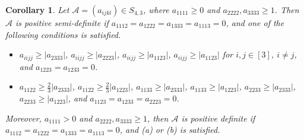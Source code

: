 \documentclass[twoside]{article}
\newtheorem{corollary}{Corollary}[section]
\begin{document}




\begin{corollary}\label{cor4}
Let ${\mathcal{A}}=(a_{ijkl})\in S_{4,3}$, where $a_{1111}\geq0$ and $a_{2222},a_{3333}\geq1$. Then $\mathcal{A}$ is positive semi-definite if $a_{1112}=a_{1222}=a_{1333}=a_{1113}=0$, and one of the following conditions is satisfied.
\begin{itemize}
  \item [(a)] $a_{iijj}\geq|a_{2333}|$, $a_{iijj}\geq|a_{2223}|$, $a_{iijj}\geq|a_{1123}|$, $a_{iijj}\geq|a_{1123}|$ for $i,j\in[3]$, $i\neq j$, and $a_{1223}=a_{1233}=0$.
   \item [(b)] $a_{1122}\geq\frac{2}{3}|a_{2333}|$, $a_{1122}\geq\frac{2}{3}|a_{1223}|$, $a_{1133}\geq|a_{2333}|$, $a_{1133}\geq|a_{1223}|$, $a_{2233}\geq|a_{2333}|$, $a_{2233}\geq|a_{1223}|$, and $a_{1123}=a_{1233}=a_{2223}=0$.
 \end{itemize}
 Moreover, $a_{1111}>0$ and $a_{2222},a_{3333}\geq1$, then $\mathcal{A}$ is positive definite if $a_{1112}=a_{1222}=a_{1333}=a_{1113}=0$, and (a) or (b) is satisfied.
\end{corollary}
\end{document}
